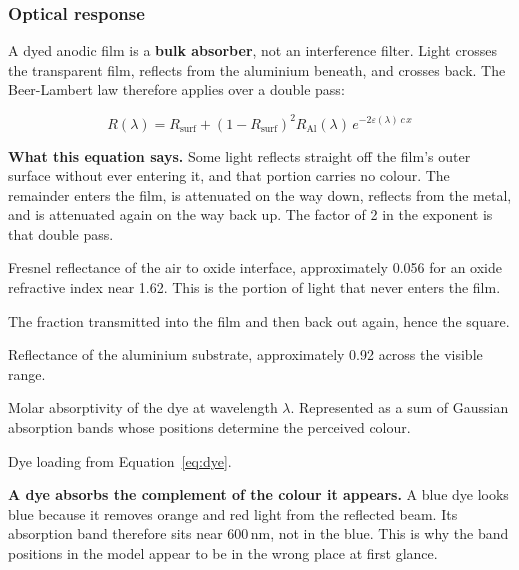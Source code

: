 \documentclass[11pt,a4paper]{article}
\newcommand{\nm}{\ensuremath{\,\mathrm{nm}}}
\newenvironment{symlist}
  {\vspace{-0.2em}\begin{list}{}{%
    \setlength{\leftmargin}{2.4em}\setlength{\labelwidth}{2.0em}%
    \setlength{\labelsep}{0.4em}\setlength{\itemsep}{1pt}%
    \setlength{\parsep}{0pt}\setlength{\topsep}{3pt}%
    \renewcommand{\makelabel}[1]{##1\hfil}}}
  {\end{list}}
\begin{document}
\subsubsection{Optical response}

A dyed anodic film is a \textbf{bulk absorber}, not an interference filter.
Light crosses the transparent film, reflects from the aluminium beneath, and
crosses back. The Beer-Lambert law therefore applies over a double pass:

\begin{equation}
R(\lambda) = R_\mathrm{surf}
+ \left(1 - R_\mathrm{surf}\right)^2 R_\mathrm{Al}(\lambda)\,
  e^{-2\varepsilon(\lambda)\,c\,x}
\label{eq:beer}
\end{equation}

\noindent\textbf{What this equation says.} Some light reflects straight off the
film's outer surface without ever entering it, and that portion carries no
colour. The remainder enters the film, is attenuated on the way down, reflects
from the metal, and is attenuated again on the way back up. The factor of 2 in
the exponent is that double pass.

\begin{symlist}
\item[$R_\mathrm{surf}$] Fresnel reflectance of the air to oxide interface,
approximately 0.056 for an oxide refractive index near 1.62. This is the
portion of light that never enters the film.
\item[$(1 - R_\mathrm{surf})^2$] The fraction transmitted into the film and
then back out again, hence the square.
\item[$R_\mathrm{Al}(\lambda)$] Reflectance of the aluminium substrate,
approximately 0.92 across the visible range.
\item[$\varepsilon(\lambda)$] Molar absorptivity of the dye at wavelength
$\lambda$. Represented as a sum of Gaussian absorption bands whose positions
determine the perceived colour.
\item[$c\,x$] Dye loading from Equation~\eqref{eq:dye}.
\end{symlist}

\begin{keypoint}
\textbf{A dye absorbs the complement of the colour it appears.} A blue dye
looks blue because it removes orange and red light from the reflected beam. Its
absorption band therefore sits near $600\nm$, not in the blue. This is why the
band positions in the model appear to be in the wrong place at first glance.
\end{keypoint}
\end{document}
